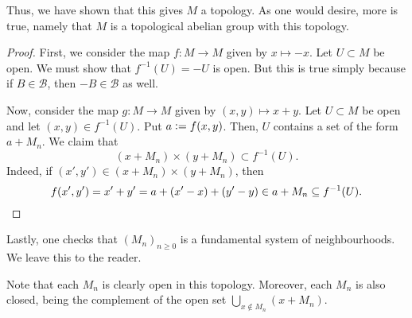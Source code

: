 Thus, we have shown that this gives $M$ a topology. As one would desire, more is true, namely that $M$ is a topological abelian group with this topology. 

\begin{proof}
	First, we consider the map $f : M \to M$ given by $x \mapsto -x$. Let $U \subset M$ be open. We must show that $f^{-1}(U) = -U$ is open. But this is true simply because if $B \in \mathcal{B}$, then $-B \in \mathcal{B}$ as well. 

	Now, consider the map $g : M \to M$ given by $(x, y) \mapsto x + y$. Let $U \subset M$ be open and let $(x, y) \in f^{-1}(U)$. Put $a \vcentcolon= f(x, y)$. Then, $U$ contains a set of the form $a + M_{n}$. We claim that
	\begin{equation*} 
		(x + M_{n}) \times (y + M_{n}) \subset f^{-1}(U).
	\end{equation*}
	Indeed, if $(x', y') \in (x + M_{n}) \times (y + M_{n})$, then
	\begin{equation*} 
		f(x', y') = x' + y' = a + (x' - x) + (y' - y) \in a + M_{n} \subset f^{-1}(U). \qedhere
	\end{equation*}
\end{proof}

Lastly, one checks that $(M_{n})_{n \ge 0}$ is a fundamental system of neighbourhoods. We leave this to the reader.

\begin{rem}
	Note that each $M_{n}$ is clearly open in this topology. Moreover, each $M_{n}$ is also closed, being the complement of the open set $\bigcup_{x \notin M_{n}} (x + M_{n})$.
\end{rem}


